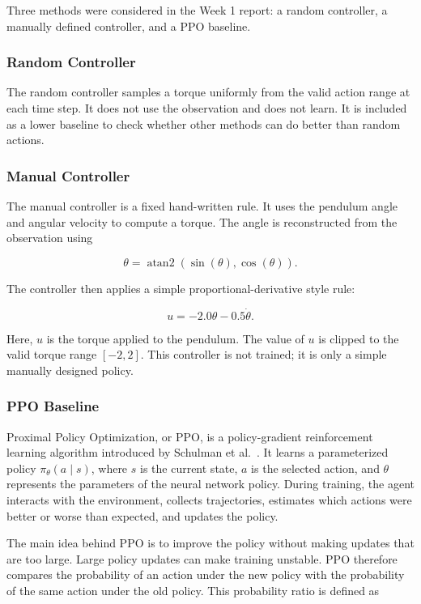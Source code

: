 \documentclass[11pt,a4paper]{article}
\begin{document}
Three methods were considered in the Week 1 report: a random controller, a manually defined controller, and a PPO baseline. 

\subsubsection{Random Controller}

The random controller samples a torque uniformly from the valid action range at each time step. It does not use the observation and does not learn. It is included as a lower baseline to check whether other methods can do better than random actions.

\subsubsection{Manual Controller}

The manual controller is a fixed hand-written rule. It uses the pendulum angle and angular velocity to compute a torque. The angle is reconstructed from the observation using

\[
\theta = \operatorname{atan2}(\sin(\theta), \cos(\theta)).
\]

The controller then applies a simple proportional-derivative style rule:

\[
u = -2.0\theta - 0.5\dot{\theta}.
\]

Here, $u$ is the torque applied to the pendulum. The value of $u$ is clipped to the valid torque range $[-2,2]$. This controller is not trained; it is only a simple manually designed policy.

\subsubsection{PPO Baseline}

Proximal Policy Optimization, or PPO, is a policy-gradient reinforcement learning algorithm introduced by Schulman et al.~\cite{schulman2017ppo}. It learns a parameterized policy $\pi_{\theta}(a \mid s)$, where $s$ is the current state, $a$ is the selected action, and $\theta$ represents the parameters of the neural network policy. During training, the agent interacts with the environment, collects trajectories, estimates which actions were better or worse than expected, and updates the policy.

The main idea behind PPO is to improve the policy without making updates that are too large. Large policy updates can make training unstable. PPO therefore compares the probability of an action under the new policy with the probability of the same action under the old policy. This probability ratio is defined as
\end{document}
